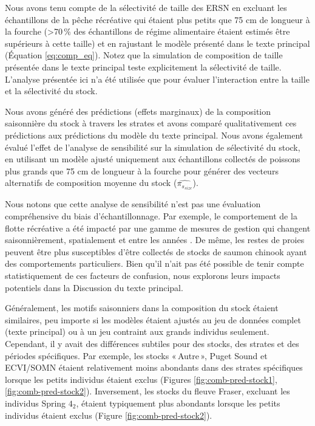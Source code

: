 \label{app:sensitivity}


Nous avons tenu compte de la sélectivité de taille des ERSN en excluant les échantillons de la pêche récréative qui étaient plus petits que 75 cm de longueur à la fourche (>70\,\% des échantillons de régime alimentaire étaient estimés être supérieurs à cette taille) et en rajustant le modèle présenté dans le texte principal (Équation \ref{eq:comp_eq}). Notez que la simulation de composition de taille présentée dans le texte principal teste explicitement la sélectivité de taille. L'analyse présentée ici n'a été utilisée que pour évaluer l'interaction entre la taille et la sélectivité du stock.

Nous avons généré des prédictions (effets marginaux) de la composition saisonnière du stock à travers les strates et avons comparé qualitativement ces prédictions aux prédictions du modèle du texte principal. Nous avons également évalué l'effet de l'analyse de sensibilité sur la simulation de sélectivité du stock, en utilisant un modèle ajusté uniquement aux échantillons collectés de poissons plus grands que 75 cm de longueur à la fourche pour générer des vecteurs alternatifs de composition moyenne du stock ($\hat{\pi_{s_{size}}}$). 

Nous notons que cette analyse de sensibilité n'est pas une évaluation compréhensive du biais d'échantillonnage. Par exemple, le comportement de la flotte récréative a été impacté par une gamme de mesures de gestion qui changent saisonnièrement, spatialement et entre les années \citep{dobsonTechnicalReviewManagement2020, dfoPacificRegionFinal2023}. De même, les restes de proies peuvent être plus susceptibles d'être collectés de stocks de saumon chinook ayant des comportements particuliers. Bien qu'il n'ait pas été possible de tenir compte statistiquement de ces facteurs de confusion, nous explorons leurs impacts potentiels dans la Discussion du texte principal. 

Généralement, les motifs saisonniers dans la composition du stock étaient similaires, peu importe si les modèles étaient ajustés au jeu de données complet (texte principal) ou à un jeu contraint aux grands individus seulement. Cependant, il y avait des différences subtiles pour des stocks, des strates et des périodes spécifiques. Par exemple, les stocks «\,Autre\,», Puget Sound et ECVI/SOMN étaient relativement moins abondants dans des strates spécifiques lorsque les petits individus étaient exclus (Figures \ref{fig:comb-pred-stock1}, \ref{fig:comb-pred-stock2}). Inversement, les stocks du fleuve Fraser, excluant les individus Spring $4_2$, étaient typiquement plus abondants lorsque les petits individus étaient exclus (Figure \ref{fig:comb-pred-stock2}). 

